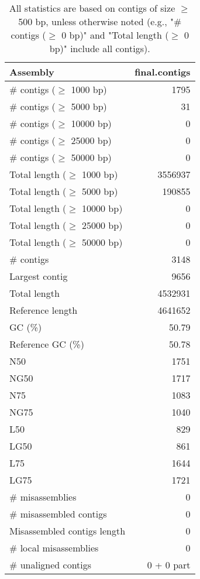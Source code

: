 \documentclass[12pt,a4paper]{article}
\begin{document}
\begin{table}[ht]
\begin{center}
\caption{All statistics are based on contigs of size $\geq$ 500 bp, unless otherwise noted (e.g., "\# contigs ($\geq$ 0 bp)" and "Total length ($\geq$ 0 bp)" include all contigs).}
\begin{tabular}{|l*{1}{|r}|}
\hline
Assembly & final.contigs \\ \hline
\# contigs ($\geq$ 1000 bp) & 1795 \\ \hline
\# contigs ($\geq$ 5000 bp) & 31 \\ \hline
\# contigs ($\geq$ 10000 bp) & 0 \\ \hline
\# contigs ($\geq$ 25000 bp) & 0 \\ \hline
\# contigs ($\geq$ 50000 bp) & 0 \\ \hline
Total length ($\geq$ 1000 bp) & 3556937 \\ \hline
Total length ($\geq$ 5000 bp) & 190855 \\ \hline
Total length ($\geq$ 10000 bp) & 0 \\ \hline
Total length ($\geq$ 25000 bp) & 0 \\ \hline
Total length ($\geq$ 50000 bp) & 0 \\ \hline
\# contigs & 3148 \\ \hline
Largest contig & 9656 \\ \hline
Total length & 4532931 \\ \hline
Reference length & 4641652 \\ \hline
GC (\%) & 50.79 \\ \hline
Reference GC (\%) & 50.78 \\ \hline
N50 & 1751 \\ \hline
NG50 & 1717 \\ \hline
N75 & 1083 \\ \hline
NG75 & 1040 \\ \hline
L50 & 829 \\ \hline
LG50 & 861 \\ \hline
L75 & 1644 \\ \hline
LG75 & 1721 \\ \hline
\# misassemblies & 0 \\ \hline
\# misassembled contigs & 0 \\ \hline
Misassembled contigs length & 0 \\ \hline
\# local misassemblies & 0 \\ \hline
\# unaligned contigs & 0 + 0 part \\ \hline

\end{tabular}
\end{center}
\end{table}
\end{document}
